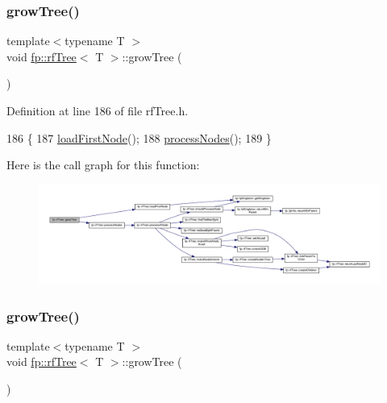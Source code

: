 \subsubsection{\texorpdfstring{grow\+Tree()}{growTree()}\hspace{0.1cm}{\footnotesize\ttfamily [1/2]}}
{\footnotesize\ttfamily template$<$typename T $>$ \\
void \hyperlink{classfp_1_1rfTree}{fp\+::rf\+Tree}$<$ T $>$\+::grow\+Tree (\begin{DoxyParamCaption}{ }\end{DoxyParamCaption})\hspace{0.3cm}{\ttfamily [inline]}}



Definition at line 186 of file rf\+Tree.\+h.


\begin{DoxyCode}
186                                \{
187                     \hyperlink{classfp_1_1rfTree_a8757adc28b68d0a99f95b8bc5d6a38db}{loadFirstNode}();
188                     \hyperlink{classfp_1_1rfTree_a7997df3477bc9f73163384c8cd0bcec9}{processNodes}();
189                 \}
\end{DoxyCode}
Here is the call graph for this function\+:
\nopagebreak
\begin{figure}[H]
\begin{center}
\leavevmode
\includegraphics[width=350pt]{classfp_1_1rfTree_a196d6006e7e2ee0575fa40d7d4621712_cgraph}
\end{center}
\end{figure}
\mbox{\label{classfp_1_1rfTree_a196d6006e7e2ee0575fa40d7d4621712}} 
\subsubsection{\texorpdfstring{grow\+Tree()}{growTree()}\hspace{0.1cm}{\footnotesize\ttfamily [2/2]}}
{\footnotesize\ttfamily template$<$typename T $>$ \\
void \hyperlink{classfp_1_1rfTree}{fp\+::rf\+Tree}$<$ T $>$\+::grow\+Tree (\begin{DoxyParamCaption}{ }\end{DoxyParamCaption})\hspace{0.3cm}{\ttfamily [inline]}}



